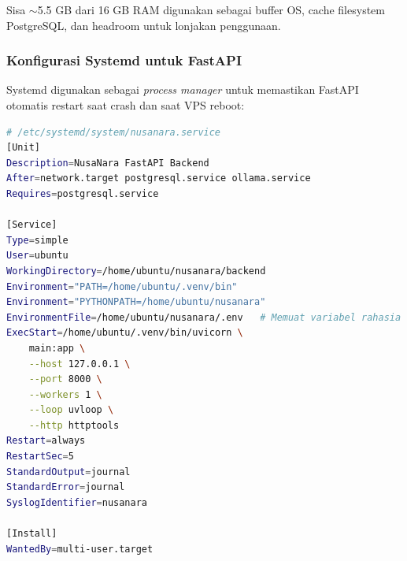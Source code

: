 Sisa $\sim$5.5 GB dari 16 GB RAM digunakan sebagai buffer OS, cache filesystem
PostgreSQL, dan headroom untuk lonjakan penggunaan.

\subsubsection{Konfigurasi Systemd untuk FastAPI}

Systemd digunakan sebagai \textit{process manager} untuk memastikan FastAPI
otomatis restart saat crash dan saat VPS reboot:

\begin{lstlisting}[language=bash, caption={Unit File Systemd untuk FastAPI NusaNara}]
# /etc/systemd/system/nusanara.service
[Unit]
Description=NusaNara FastAPI Backend
After=network.target postgresql.service ollama.service
Requires=postgresql.service

[Service]
Type=simple
User=ubuntu
WorkingDirectory=/home/ubuntu/nusanara/backend
Environment="PATH=/home/ubuntu/.venv/bin"
Environment="PYTHONPATH=/home/ubuntu/nusanara"
EnvironmentFile=/home/ubuntu/nusanara/.env   # Memuat variabel rahasia
ExecStart=/home/ubuntu/.venv/bin/uvicorn \
    main:app \
    --host 127.0.0.1 \
    --port 8000 \
    --workers 1 \
    --loop uvloop \
    --http httptools
Restart=always
RestartSec=5
StandardOutput=journal
StandardError=journal
SyslogIdentifier=nusanara

[Install]
WantedBy=multi-user.target
\end{lstlisting}

